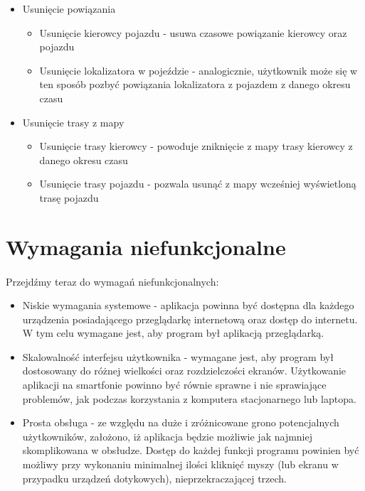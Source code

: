 \begin{itemize}
\item Usunięcie powiązania
\begin{itemize}
	\item Usunięcie kierowcy pojazdu - usuwa czasowe powiązanie kierowcy oraz pojazdu
	\item Usunięcie lokalizatora w pojeździe - analogicznie, użytkownik może się w ten sposób pozbyć powiązania lokalizatora z pojazdem z danego okresu czasu
\end{itemize}
\item Usunięcie trasy z mapy
\begin{itemize}
	\item Usunięcie trasy kierowcy - powoduje zniknięcie z mapy trasy kierowcy z danego okresu czasu
	\item Usunięcie trasy pojazdu - pozwala usunąć z mapy wcześniej wyświetloną trasę pojazdu 
\end{itemize}
\end{itemize}

\section{Wymagania niefunkcjonalne}
\paragraph{}
Przejdźmy teraz do wymagań niefunkcjonalnych:

\begin{itemize}
	\item Niskie wymagania systemowe - aplikacja powinna być dostępna dla każdego urządzenia posiadającego przeglądarkę internetową oraz dostęp do internetu. W tym celu wymagane jest, aby program był aplikacją przeglądarką.
	\item Skalowalność interfejsu użytkownika - wymagane jest, aby program był dostosowany do różnej wielkości oraz rozdzielczości ekranów. Użytkowanie aplikacji na smartfonie powinno być równie sprawne i nie sprawiające problemów, jak podczas korzystania z komputera stacjonarnego lub laptopa.
	\item Prosta obsługa - ze względu na duże i zróżnicowane grono potencjalnych użytkowników, założono, iż aplikacja będzie możliwie jak najmniej skomplikowana w obsłudze. Dostęp do każdej funkcji programu powinien być możliwy przy wykonaniu minimalnej ilości kliknięć myszy (lub ekranu w przypadku urządzeń dotykowych), nieprzekraczającej trzech.
\end{itemize}

